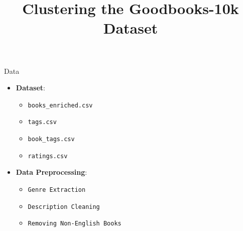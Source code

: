 \documentclass{beamer}
\title{Clustering the Goodbooks-10k Dataset}
\author[\FirstName \space \LastName]
{\FirstName{} \LastName}
\begin{document}
\frame{\titlepage}


\begin{frame}{Data}
    \begin{itemize}
        \item \textbf{Dataset}:
            \begin{itemize}
                \item \texttt{books\_enriched.csv}
                \item \texttt{tags.csv}
                \item \texttt{book\_tags.csv}
                \item \texttt{ratings.csv}
            \end{itemize}
        \item \textbf{Data Preprocessing}:
            \begin{itemize}
                \item \texttt{Genre Extraction}
                \item \texttt{Description Cleaning}
                \item \texttt{Removing Non-English Books}
            \end{itemize}
    \end{itemize}
\end{frame}
\end{document}
